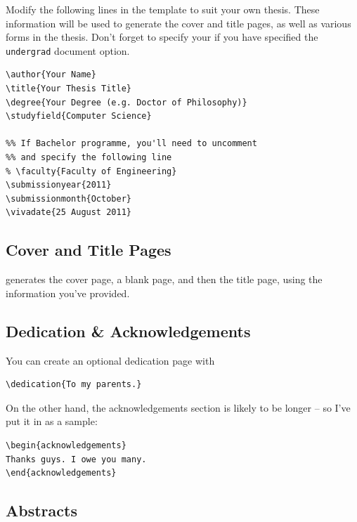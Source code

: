 \documentclass[a4paper,nofonts,raggedright,titlepage,openany]{tufte-book}
\begin{document}
Modify the following lines in the template to suit your own thesis. These information will be used to generate the cover and title pages, as well as various forms in the thesis. Don't forget to specify your \texttt{\faculty}  if you have specified the \texttt{undergrad} document option.

\begin{verbatim}
\author{Your Name}
\title{Your Thesis Title}
\degree{Your Degree (e.g. Doctor of Philosophy)}
\studyfield{Computer Science}

%% If Bachelor programme, you'll need to uncomment
%% and specify the following line
% \faculty{Faculty of Engineering}
\submissionyear{2011}
\submissionmonth{October}
\vivadate{25 August 2011}
\end{verbatim}


\subsection{Cover and Title Pages}

\texttt{\makecoverandtitlepage} generates the cover page,  a blank page, and then the title page, using the information you've provided.

\subsection{Dedication \& Acknowledgements}

You can create an optional dedication page with 

\begin{verbatim}
\dedication{To my parents.}
\end{verbatim}

On the other hand, the acknowledgements section is likely to be longer -- so I've put it in  as a sample:

\begin{verbatim}
\begin{acknowledgements}
Thanks guys. I owe you many.
\end{acknowledgements}
\end{verbatim}

\subsection{Abstracts}
\end{document}
